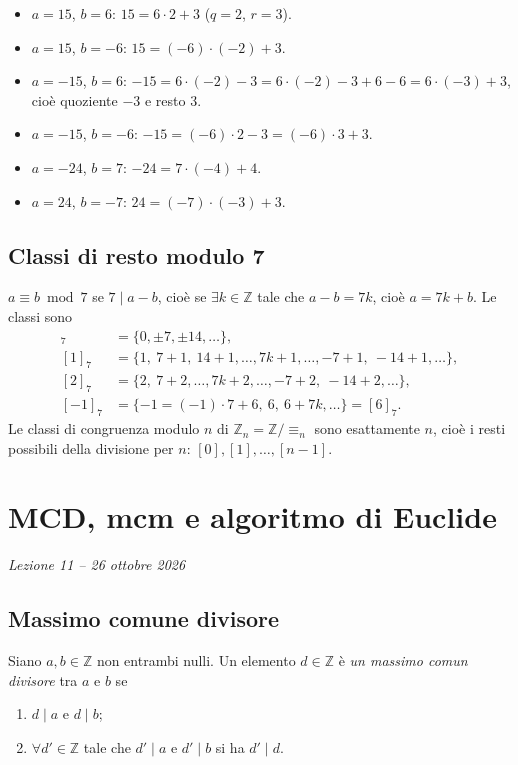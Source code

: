 \documentclass[11pt,a4paper]{article}
\begin{document}
\begin{esempio}
\begin{itemize}
  \item $a = 15$, $b = 6$: $15 = 6\cdot 2 + 3$ ($q = 2$, $r = 3$).
  \item $a = 15$, $b = -6$: $15 = (-6)\cdot(-2) + 3$.
  \item $a = -15$, $b = 6$: $-15 = 6\cdot(-2) - 3 = 6\cdot(-2) - 3 + 6 - 6 = 6\cdot(-3) + 3$, cioè quoziente $-3$ e resto $3$.
  \item $a = -15$, $b = -6$: $-15 = (-6)\cdot 2 - 3 = (-6)\cdot 3 + 3$.
  \item $a = -24$, $b = 7$: $-24 = 7\cdot(-4) + 4$.
  \item $a = 24$, $b = -7$: $24 = (-7)\cdot(-3) + 3$.
\end{itemize}
\end{esempio}

\subsection{Classi di resto modulo 7}

$a \equiv b \bmod 7$ se $7 \mid a - b$, cioè se $\exists k \in \mathbb{Z}$ tale che $a - b = 7k$, cioè $a = 7k + b$. Le classi sono
\begin{align*}
  [0]_7 &= \{0, \pm 7, \pm 14, \dots\},\\
  [1]_7 &= \{1,\ 7 + 1,\ 14 + 1, \dots, 7k + 1, \dots, -7 + 1,\ -14 + 1, \dots\},\\
  [2]_7 &= \{2,\ 7 + 2, \dots, 7k + 2, \dots, -7 + 2,\ -14 + 2, \dots\},\\
  [-1]_7 &= \{-1 = (-1)\cdot 7 + 6,\ 6,\ 6 + 7k, \dots\} = [6]_7 .
\end{align*}
Le classi di congruenza modulo $n$ di $\mathbb{Z}_n = \mathbb{Z}/{\equiv_n}$ sono esattamente $n$, cioè i resti possibili della divisione per $n$: $[0], [1], \dots, [n-1]$.

\section[MCD, mcm e algoritmo di Euclide (Lezione 11 -- 26 ottobre 2026)]{MCD, mcm e algoritmo di Euclide}
\noindent\emph{Lezione 11 -- 26 ottobre 2026}
\subsection{Massimo comune divisore}

\begin{definizione}
Siano $a, b \in \mathbb{Z}$ non entrambi nulli. Un elemento $d \in \mathbb{Z}$ è \emph{un massimo comun divisore} tra $a$ e $b$ se
\begin{enumerate}
  \item[i)] $d \mid a$ e $d \mid b$;
  \item[ii)] $\forall d' \in \mathbb{Z}$ tale che $d' \mid a$ e $d' \mid b$ si ha $d' \mid d$.
\end{enumerate}
\end{definizione}
\end{document}
